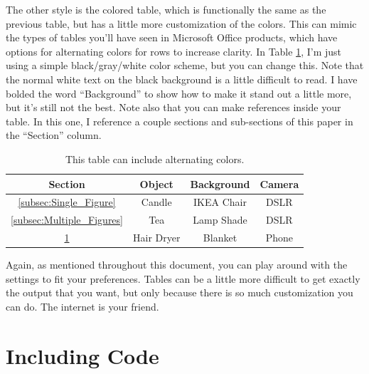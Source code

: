 \documentclass[letterpaper,12pt]{article}
\begin{document}
The other style is the colored table, which is functionally the same as the previous table, but has a little more customization of the colors.  This can mimic the types of tables you'll have seen in Microsoft Office products, which have options for alternating colors for rows to increase clarity.  In Table \ref{tab:Colored}, I'm just using a simple black/gray/white color scheme, but you can change this.  Note that the normal white text on the black background is a little difficult to read.  I have bolded the word ``Background'' to show how to make it stand out a little more, but it's still not the best.  Note also that you can make references inside your table.  In this one, I reference a couple sections and sub-sections of this paper in the ``Section'' column.

\begin{table}[H]
\setlength{\arrayrulewidth}{0.5mm}
\setlength{\tabcolsep}{12pt}
\renewcommand{\arraystretch}{1.5}
{
\begin{center}
\begin{tabular}{| c | c | c | c |}
\hline
\rowcolor{black}
\color{white} Section & \color{white} Object & \color{white}\textbf{Background} & \color{white}Camera \\[1ex]
\hline
\ref{subsec:Single_Figure}			& Candle 		& IKEA Chair 	& DSLR			\\
\ref{subsec:Multiple_Figures}		& Tea			& Lamp Shade	& DSLR			\\
\ref{sec:Including_Code}			& Hair Dryer	& Blanket		& Phone			\\\hline
\end{tabular}
\end{center}
}
\caption{This table can include alternating colors.}
\label{tab:Colored}
\end{table}

Again, as mentioned throughout this document, you can play around with the settings to fit your preferences.  Tables can be a little more difficult to get exactly the output that you want, but only because there is so much customization you can do.  The internet is your friend.

\section{Including Code}
\label{sec:Including_Code}
\end{document}
